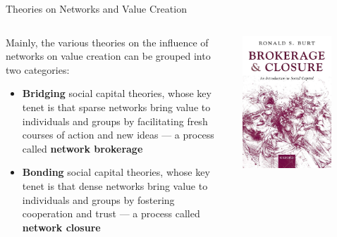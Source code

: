 \documentclass[aspectratio=1610]{beamer}
\begin{document}
\begin{frame}{Theories on Networks and Value Creation}
\begin{columns}
	\begin{column}{0.5\textwidth}
	Mainly, the various theories on the influence of networks on value 
	creation can be grouped into two categories:

	\vspace{1em}

	\begin{itemize}
		\item \textbf{Bridging} social capital theories, whose key 
		      tenet is that sparse networks bring value to 
		      individuals and groups by facilitating fresh courses 
		      of action and new ideas --- a process called 
		      \textbf{network brokerage} 
		\item \textbf{Bonding} social capital theories, whose key 
		      tenet is that dense networks bring value to 
		      individuals and groups by fostering cooperation and trust
		      ---  a process called \textbf{network closure}
	\end{itemize}
	\end{column}
	\begin{column}{0.5\textwidth}
		\centering
		\includegraphics[width=0.75\textwidth]{images/brokerage_and_closure.jpeg}
	\end{column}
\end{columns}
\end{frame}
\end{document}
